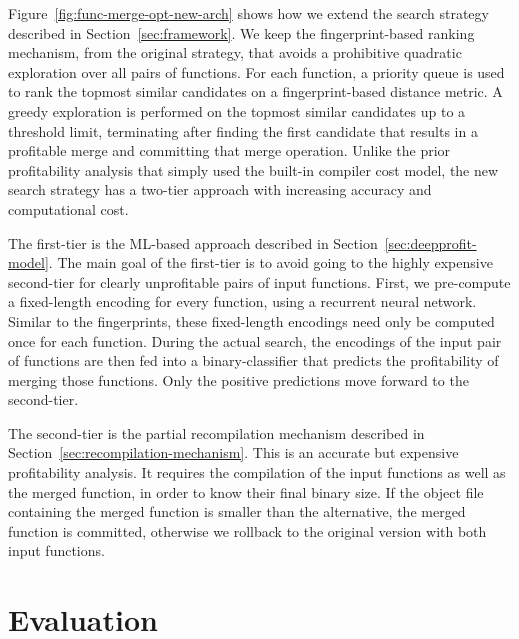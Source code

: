 Figure~\ref{fig:func-merge-opt-new-arch} shows how we extend the search strategy described in Section~\ref{sec:framework}.
We keep the fingerprint-based ranking mechanism, from the original strategy, that avoids a prohibitive quadratic exploration over all pairs of functions.
For each function, a priority queue is used to rank the topmost similar candidates on a fingerprint-based distance metric.
A greedy exploration is performed on the topmost similar candidates up to a threshold limit, terminating after finding the first candidate that results in a profitable merge and committing that merge operation.
Unlike the prior profitability analysis that simply used the built-in compiler cost model, the new search strategy has a two-tier approach with increasing accuracy and computational cost.

The first-tier is the ML-based approach described in Section~\ref{sec:deepprofit-model}.
The main goal of the first-tier is to avoid going to the highly expensive second-tier for clearly unprofitable pairs of input functions. 
First, we pre-compute a fixed-length encoding for every function, using a recurrent neural network.
Similar to the fingerprints, these fixed-length encodings need only be computed once for each function.
During the actual search, the encodings of the input pair of functions are then fed into a binary-classifier that predicts the profitability of merging those functions.
Only the positive predictions move forward to the second-tier.

The second-tier is the partial recompilation mechanism described in Section~\ref{sec:recompilation-mechanism}.
This is an accurate but expensive profitability analysis.
It requires the compilation of the input functions as well as the merged function, in order to know their final binary size.
If the object file containing the merged function is smaller than the alternative, the merged function is committed, otherwise we rollback to the original version with both input functions.

\section{Evaluation}



